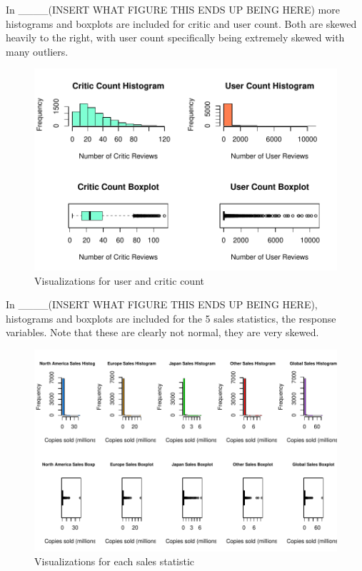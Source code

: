 \documentclass[12pt]{article}
\begin{document}
In ____(INSERT WHAT FIGURE THIS ENDS UP BEING HERE) more histograms and boxplots are included for critic and user count.
Both are skewed heavily to the right, with user count specifically being extremely skewed with many outliers.
\begin{figure}[tbp]
  \centering
  \includegraphics[width=\textwidth]{histandboxpt2.pdf}
  \caption{Visualizations for user and critic count}
  \label{fig:histandboxpt2}
\end{figure}


In ____(INSERT WHAT FIGURE THIS ENDS UP BEING HERE), histograms and boxplots are included for the 5 sales statistics, the response variables.
Note that these are clearly not normal, they are very skewed. 

\begin{figure}[tbp]
  \centering
  \includegraphics[width=\textwidth]{histandboxsales.pdf}
  \caption{Visualizations for each sales statistic}
  \label{fig:histandboxsales}
\end{figure}
\end{document}
